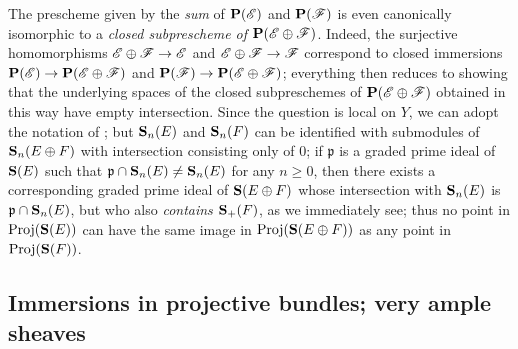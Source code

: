 \begin{remark}[4.3.6]
\label{II.4.3.6}
The prescheme given by the \emph{sum} of $\mathbf{P}(\mathscr{E})$ and $\mathbf{P}(\mathscr{F})$ is even canonically isomorphic to a \emph{closed subprescheme of $\mathbf{P}(\mathscr{E}\oplus\mathscr{F})$}.
Indeed, the surjective homomorphisms $\sh{E}\oplus\sh{F}\to\sh{E}$ and $\sh{E}\oplus\sh{F}\to\sh{F}$ correspond to closed immersions $\bb{P}(\sh{E})\to\bb{P}(\sh{E}\oplus\sh{F})$ and $\bb{P}(\sh{F})\to\bb{P}(\sh{E}\oplus\sh{F})$;
everything then reduces to showing that the underlying spaces of the closed subpreschemes of $\mathbf{P}(\mathscr{E}\oplus\mathscr{F})$ obtained in this way have empty intersection.
Since the question is local on $Y$, we can adopt the notation of ;
but $\mathbf{S}_n(E)$ and $\mathbf{S}_n(F)$ can be identified with submodules of $\mathbf{S}_n(E\oplus F)$ with intersection consisting only of $0$;
if $\mathfrak{p}$ is a graded prime ideal of $\mathbf{S}(E)$ such that $\mathfrak{p}\cap\mathbf{S}_n(E)\neq\mathbf{S}_n(E)$ for any $n\geq0$, then there exists a corresponding graded prime ideal of $\mathbf{S}(E\oplus F)$ whose intersection with $\mathbf{S}_n(E)$ is $\mathfrak{p}\cap\mathbf{S}_n(E)$, but who also \emph{contains} $\mathbf{S}_+(F)$, as we immediately see;
thus no point in $\operatorname{Proj}(\mathbf{S}(E))$ can have the same image in $\operatorname{Proj}(\mathbf{S}(E\oplus F))$ as any point in $\operatorname{Proj}(\mathbf{S}(F))$.
\end{remark}


\subsection{Immersions in projective bundles; very ample sheaves}
\label{subsection:II.4.4}




